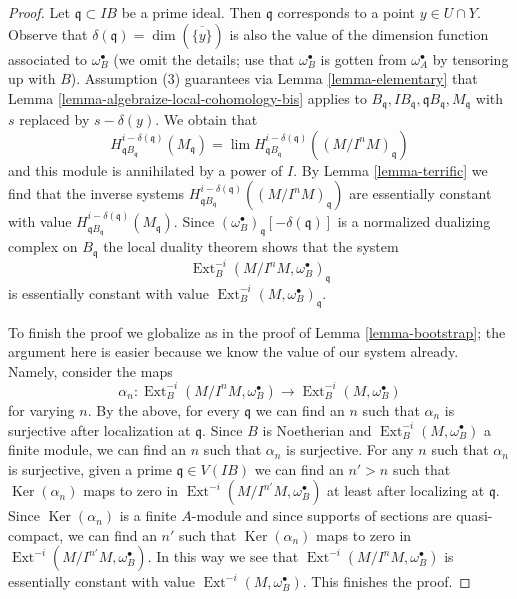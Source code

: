 \documentclass{stacks-project}
\theoremstyle{plain}
\theoremstyle{definition}
\theoremstyle{remark}
\numberwithin{equation}{subsection}
\def\lim{\mathop{\mathrm{lim}}\nolimits}
\def\Ext{\mathop{\mathrm{Ext}}\nolimits}
\def\Ker{\mathop{\mathrm{Ker}}}
\begin{document}
\begin{proof}
\medskip\noindent
Let $\mathfrak q \subset IB$ be a prime ideal. Then $\mathfrak q$ corresponds
to a point $y \in U \cap Y$. Observe that
$\delta(\mathfrak q) = \dim(\overline{\{y\}})$
is also the value of the dimension function associated to $\omega_B^\bullet$
(we omit the details; use that $\omega_B^\bullet$ is gotten from
$\omega_A^\bullet$ by tensoring up with $B$). Assumption
(3) guarantees via Lemma \ref{lemma-elementary}
that Lemma \ref{lemma-algebraize-local-cohomology-bis}
applies to
$B_\mathfrak q, IB_\mathfrak q, \mathfrak qB_\mathfrak q, M_\mathfrak q$
with $s$ replaced by $s - \delta(y)$. We obtain that
$$
H^{i - \delta(\mathfrak q)}_{\mathfrak qB_\mathfrak q}(M_\mathfrak q) =
\lim H^{i - \delta(\mathfrak q)}_{\mathfrak qB_\mathfrak q}(
(M/I^nM)_\mathfrak q)
$$
and this module is annihilated by a power of $I$.
By Lemma \ref{lemma-terrific} we find that the inverse systems
$H^{i - \delta(\mathfrak q)}_{\mathfrak qB_\mathfrak q}((M/I^nM)_\mathfrak q)$
are essentially constant with value
$H^{i - \delta(\mathfrak q)}_{\mathfrak qB_\mathfrak q}(M_\mathfrak q)$.
Since $(\omega_B^\bullet)_\mathfrak q[-\delta(\mathfrak q)]$ is a normalized
dualizing complex on $B_\mathfrak q$ the local duality theorem
shows that the system
$$
\Ext^{-i}_B(M/I^n M, \omega_B^\bullet)_\mathfrak q
$$
is essentially constant with value
$\Ext^{-i}_B(M, \omega_B^\bullet)_\mathfrak q$.

\medskip\noindent
To finish the proof we globalize as in the proof of
Lemma \ref{lemma-bootstrap}; the argument here is easier
because we know the value of our system already. Namely, consider the maps
$$
\alpha_n :
\Ext^{-i}_B(M/I^n M, \omega_B^\bullet)
\longrightarrow
\Ext^{-i}_B(M, \omega_B^\bullet)
$$
for varying $n$. By the above, for every $\mathfrak q$ we can find an
$n$ such that $\alpha_n$ is surjective after localization at $\mathfrak q$.
Since $B$ is Noetherian and $\Ext^{-i}_B(M, \omega_B^\bullet)$
a finite module, we can find an $n$ such that $\alpha_n$ is surjective.
For any $n$ such that $\alpha_n$ is surjective, given a prime
$\mathfrak q \in V(IB)$ we can find an $n' > n$ such that
$\Ker(\alpha_n)$ maps to zero in $\Ext^{-i}(M/I^{n'}M, \omega_B^\bullet)$
at least after localizing at $\mathfrak q$.
Since $\Ker(\alpha_n)$ is a finite $A$-module and since supports of
sections are quasi-compact, we can find an $n'$ such that
$\Ker(\alpha_n)$ maps to zero in $\Ext^{-i}(M/I^{n'}M, \omega_B^\bullet)$.
In this way we see that $\Ext^{-i}(M/I^n M, \omega_B^\bullet)$
is essentially constant with value $\Ext^{-i}(M, \omega_B^\bullet)$.
This finishes the proof.
\end{proof}
\end{document}
